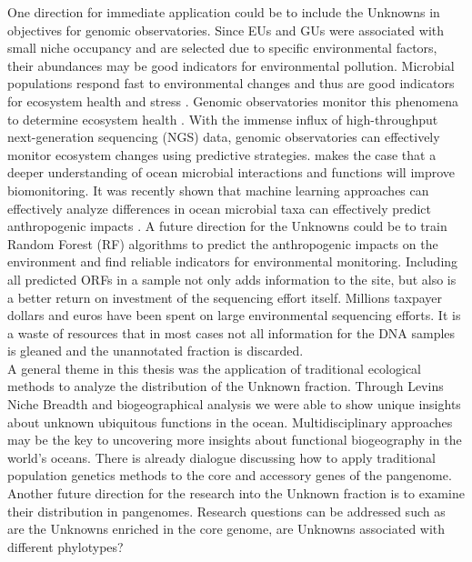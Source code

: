 One direction for immediate application could be to include the Unknowns in objectives for genomic observatories. Since EUs and GUs were associated with small niche occupancy and are selected due to specific environmental factors, their abundances may be good indicators for environmental pollution. Microbial populations respond fast to environmental changes and thus are good indicators for ecosystem health and stress \citep{Buttigieg_2018}. Genomic observatories monitor this phenomena to determine ecosystem health \citep{ Davies_2012}. With the immense influx of high-throughput next-generation sequencing (NGS) data, genomic observatories can effectively monitor ecosystem changes using predictive strategies. \cite{ Buttigieg_2018} makes the case that a deeper understanding of ocean microbial interactions and functions will improve biomonitoring. It was recently shown that machine learning approaches can effectively analyze differences in ocean microbial taxa can effectively predict anthropogenic impacts \citep{Cordier_2017}. A future direction for the Unknowns could be to train Random Forest (RF) algorithms to predict the anthropogenic impacts on the environment and find reliable indicators for environmental monitoring.
Including all predicted ORFs in a sample not only adds information to the site, but also is a better return on investment of the sequencing effort itself. Millions taxpayer dollars and euros have been spent on large environmental sequencing efforts. It is a waste of resources that in most cases not all information for the DNA samples is gleaned and the unannotated fraction is discarded.\\

A general theme in this thesis was the application of traditional ecological methods to analyze the distribution of the Unknown fraction. Through Levin\textquotesingle s Niche Breadth and biogeographical analysis we were able to show unique insights about unknown ubiquitous functions in the ocean. Multidisciplinary approaches may be the key to uncovering more insights about functional biogeography in the world's oceans. There is already dialogue discussing how to apply traditional population genetics methods to the core and accessory genes of the pangenome. Another future direction for the research into the Unknown fraction is to examine their distribution in pangenomes. Research questions can be addressed such as are the Unknowns enriched in the core genome, are Unknowns associated with different phylotypes?  \\

